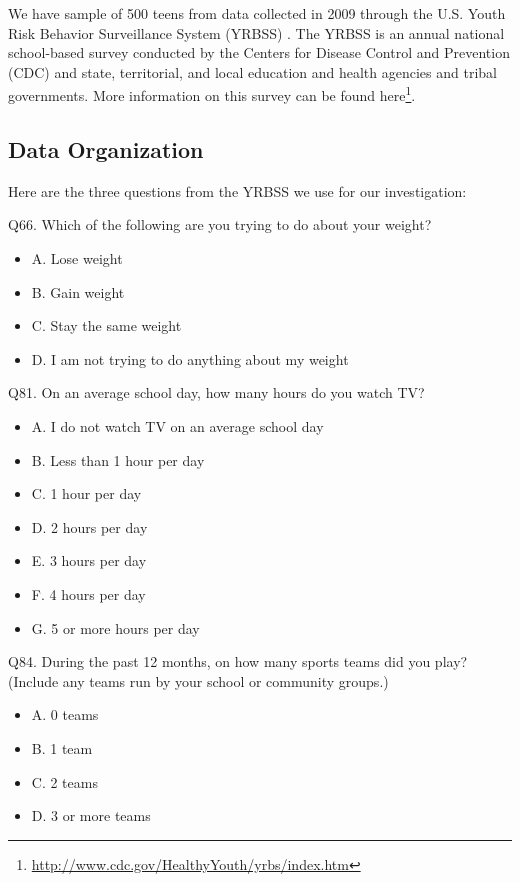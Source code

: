 \documentclass[
]{krantz}
\providecommand{\tightlist}{%
  \setlength{\itemsep}{0pt}\setlength{\parskip}{0pt}}
\renewcommand{\href}[2]{#2\footnote{\url{#1}}}
\begin{document}
We have sample of 500 teens from data collected in 2009 through the U.S. Youth Risk Behavior Surveillance System (YRBSS) \citep{YRBS2009}. The YRBSS is an annual national school-based survey conducted by the Centers for Disease Control and Prevention (CDC) and state, territorial, and local education and health agencies and tribal governments. More information on this survey can be found \href{http://www.cdc.gov/HealthyYouth/yrbs/index.htm}{here}.

\hypertarget{data-organization-3}{%
\subsection{Data Organization}\label{data-organization-3}}

Here are the three questions from the YRBSS we use for our investigation:

Q66. Which of the following are you trying to do about your weight?

\begin{itemize}
\tightlist
\item
  A. Lose weight
\item
  B. Gain weight
\item
  C. Stay the same weight
\item
  D. I am not trying to do anything about my weight
\end{itemize}

Q81. On an average school day, how many hours do you watch TV?

\begin{itemize}
\tightlist
\item
  A. I do not watch TV on an average school day
\item
  B. Less than 1 hour per day
\item
  C. 1 hour per day
\item
  D. 2 hours per day
\item
  E. 3 hours per day
\item
  F. 4 hours per day
\item
  G. 5 or more hours per day
\end{itemize}

Q84. During the past 12 months, on how many sports teams did you play? (Include any teams run by your school or community groups.)

\begin{itemize}
\tightlist
\item
  A. 0 teams
\item
  B. 1 team
\item
  C. 2 teams
\item
  D. 3 or more teams
\end{itemize}
\end{document}
